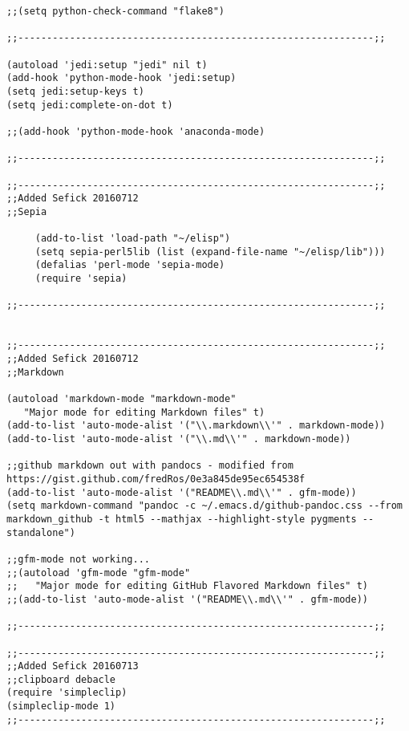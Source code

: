 \documentclass[11pt]{article}
\begin{document}
\begin{verbatim}
;;(setq python-check-command "flake8")

;;--------------------------------------------------------------;;

(autoload 'jedi:setup "jedi" nil t)
(add-hook 'python-mode-hook 'jedi:setup)
(setq jedi:setup-keys t)
(setq jedi:complete-on-dot t)

;;(add-hook 'python-mode-hook 'anaconda-mode)

;;--------------------------------------------------------------;;

;;--------------------------------------------------------------;;
;;Added Sefick 20160712
;;Sepia

     (add-to-list 'load-path "~/elisp")
     (setq sepia-perl5lib (list (expand-file-name "~/elisp/lib")))
     (defalias 'perl-mode 'sepia-mode)
     (require 'sepia)

;;--------------------------------------------------------------;;


;;--------------------------------------------------------------;;
;;Added Sefick 20160712
;;Markdown

(autoload 'markdown-mode "markdown-mode"
   "Major mode for editing Markdown files" t)
(add-to-list 'auto-mode-alist '("\\.markdown\\'" . markdown-mode))
(add-to-list 'auto-mode-alist '("\\.md\\'" . markdown-mode))

;;github markdown out with pandocs - modified from https://gist.github.com/fredRos/0e3a845de95ec654538f
(add-to-list 'auto-mode-alist '("README\\.md\\'" . gfm-mode))
(setq markdown-command "pandoc -c ~/.emacs.d/github-pandoc.css --from markdown_github -t html5 --mathjax --highlight-style pygments --standalone")

;;gfm-mode not working...
;;(autoload 'gfm-mode "gfm-mode"
;;   "Major mode for editing GitHub Flavored Markdown files" t)
;;(add-to-list 'auto-mode-alist '("README\\.md\\'" . gfm-mode))

;;--------------------------------------------------------------;;

;;--------------------------------------------------------------;;
;;Added Sefick 20160713
;;clipboard debacle
(require 'simpleclip)
(simpleclip-mode 1)
;;--------------------------------------------------------------;;


\end{verbatim}
\end{document}
